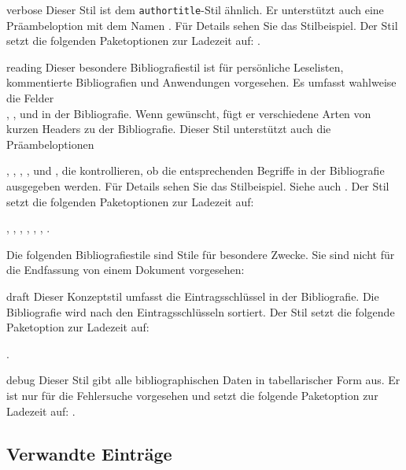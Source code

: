 \documentclass{ltxdockit}[2011/03/25]
\begin{document}
\begin{marglist}
\item[verbose] Dieser Stil ist dem \texttt{authortitle}-Stil ähnlich. Er
unterstützt auch eine Präambeloption mit dem Namen . Für Details
sehen Sie das Stilbeispiel. Der Stil setzt die folgenden Paketoptionen zur
Ladezeit auf: .  

\item[reading] Dieser besondere Bibliografiestil ist für persönliche
Leselisten, kommentierte Bibliografien und Anwendungen vorgesehen. Es umfasst
wahlweise die Felder\\
, ,
 und  in der Bibliografie. Wenn gewünscht,
fügt er verschiedene Arten von kurzen Headers zu der Bibliografie. Dieser Stil
unterstützt auch die Präambeloptionen 

, , , , 
und , die
kontrollieren, ob die entsprechenden Begriffe in der Bibliografie ausgegeben
werden. Für Details sehen Sie das Stilbeispiel. Siehe auch . Der
Stil setzt die folgenden Paketoptionen zur Ladezeit auf:

, , , , , , 
.

\end{marglist}

Die folgenden Bibliografiestile sind Stile für besondere Zwecke. Sie sind nicht
für die Endfassung von einem Dokument vorgesehen:

\begin{marglist}

\item[draft] Dieser Konzeptstil umfasst die Eintragsschlüssel in der
Bibliografie. Die Bibliografie wird nach den Eintragsschlüsseln sortiert. Der
Stil setzt die folgende Paketoption zur Ladezeit auf:

. 

\item[debug] Dieser Stil gibt alle bibliographischen Daten in tabellarischer Form
aus. Er ist nur für die Fehlersuche vorgesehen und setzt die folgende
Paketoption zur Ladezeit auf: . 

\end{marglist}

\subsection{Verwandte Einträge}
\label{use:rel}
\end{document}
